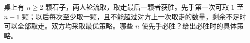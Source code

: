 桌上有 $n\ge2$ 颗石子，两人轮流取，取走最后一颗者获胜。先手第一次可取 $1$ 至 $n-1$ 颗；以后每次至少取一颗，且不能超过对方上一次取走的数量，剩余不足时可以全部取走。双方均采取最优策略。哪些 $n$ 使先手必胜？给出必胜时的具体策略。
